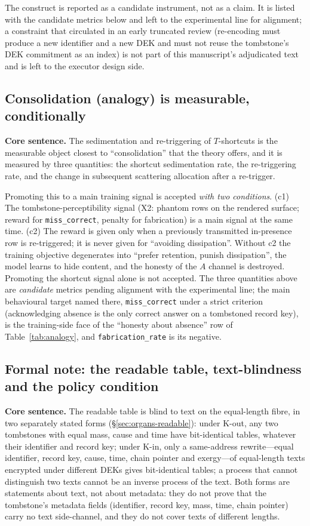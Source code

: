 \documentclass[11pt,a4paper]{article}
\begin{document}
The construct is reported as a candidate instrument, not as a claim. It is listed with the candidate metrics below and left to the experimental line for alignment; a constraint that circulated in an early truncated review (re-encoding must produce a new identifier and a new DEK and must not reuse the tombstone's DEK commitment as an index) is not part of this manuscript's adjudicated text and is left to the executor design side.

\subsection{Consolidation (analogy) is measurable, conditionally}
\label{sec:memory-consolidation}

\textbf{Core sentence.} The sedimentation and re-triggering of $T$-shortcuts is the measurable object closest to ``consolidation'' that the theory offers, and it is measured by three quantities: the shortcut sedimentation rate, the re-triggering rate, and the change in subsequent scattering allocation after a re-trigger.

Promoting this to a main training signal is accepted \emph{with two conditions}. (c1) The tombstone-perceptibility signal (X2: phantom rows on the rendered surface; reward for \texttt{miss\_correct}, penalty for fabrication) is a main signal at the same time. (c2) The reward is given only when a previously transmitted in-presence row is re-triggered; it is never given for ``avoiding dissipation''. Without c2 the training objective degenerates into ``prefer retention, punish dissipation'', the model learns to hide content, and the honesty of the $A$ channel is destroyed. Promoting the shortcut signal alone is not accepted. The three quantities above are \emph{candidate} metrics pending alignment with the experimental line; the main behavioural target named there, \texttt{miss\_correct} under a strict criterion (acknowledging absence is the only correct answer on a tombstoned record key), is the training-side face of the ``honesty about absence'' row of Table~\ref{tab:analogy}, and \texttt{fabrication\_rate} is its negative.

\subsection{Formal note: the readable table, text-blindness and the policy condition}
\label{sec:memory-formal}

\textbf{Core sentence.} The readable table is blind to text on the equal-length fibre, in two separately stated forms (\S\ref{sec:organs-readable}): under K-out, any two tombstones with equal mass, cause and time have bit-identical tables, whatever their identifier and record key; under K-in, only a same-address rewrite---equal identifier, record key, cause, time, chain pointer and exergy---of equal-length texts encrypted under different DEKs gives bit-identical tables; a process that cannot distinguish two texts cannot be an inverse process of the text. Both forms are statements about text, not about metadata: they do not prove that the tombstone's metadata fields (identifier, record key, mass, time, chain pointer) carry no text side-channel, and they do not cover texts of different lengths.
\end{document}
